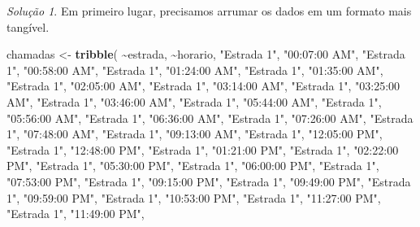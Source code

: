 \documentclass[
]{latex/krantz}
\newenvironment{Shaded}{\begin{snugshade}}{\end{snugshade}}
\newcommand{\FunctionTok}[1]{\textcolor[rgb]{0.13,0.29,0.53}{\textbf{#1}}}
\newcommand{\NormalTok}[1]{#1}
\newcommand{\OtherTok}[1]{\textcolor[rgb]{0.56,0.35,0.01}{#1}}
\newcommand{\SpecialCharTok}[1]{\textcolor[rgb]{0.81,0.36,0.00}{\textbf{#1}}}
\newcommand{\StringTok}[1]{\textcolor[rgb]{0.31,0.60,0.02}{#1}}
\theoremstyle{definition}
\theoremstyle{definition}
\theoremstyle{definition}
\theoremstyle{definition}
\theoremstyle{remark}
\newtheorem*{solution}{Solução}
\begin{document}
\begin{solution}
Em primeiro lugar, precisamos arrumar os dados em um formato mais tangível.

\begin{Shaded}
\begin{Highlighting}[]
\NormalTok{chamadas }\OtherTok{\textless{}{-}} \FunctionTok{tribble}\NormalTok{(}
  \SpecialCharTok{\textasciitilde{}}\NormalTok{estrada, }\SpecialCharTok{\textasciitilde{}}\NormalTok{horario,}
  \StringTok{"Estrada 1"}\NormalTok{, }\StringTok{"00:07:00 AM"}\NormalTok{, }
  \StringTok{"Estrada 1"}\NormalTok{, }\StringTok{"00:58:00 AM"}\NormalTok{, }
  \StringTok{"Estrada 1"}\NormalTok{, }\StringTok{"01:24:00 AM"}\NormalTok{, }
  \StringTok{"Estrada 1"}\NormalTok{, }\StringTok{"01:35:00 AM"}\NormalTok{, }
  \StringTok{"Estrada 1"}\NormalTok{, }\StringTok{"02:05:00 AM"}\NormalTok{, }
  \StringTok{"Estrada 1"}\NormalTok{, }\StringTok{"03:14:00 AM"}\NormalTok{, }
  \StringTok{"Estrada 1"}\NormalTok{, }\StringTok{"03:25:00 AM"}\NormalTok{, }
  \StringTok{"Estrada 1"}\NormalTok{, }\StringTok{"03:46:00 AM"}\NormalTok{,}
  \StringTok{"Estrada 1"}\NormalTok{, }\StringTok{"05:44:00 AM"}\NormalTok{, }
  \StringTok{"Estrada 1"}\NormalTok{, }\StringTok{"05:56:00 AM"}\NormalTok{, }
  \StringTok{"Estrada 1"}\NormalTok{, }\StringTok{"06:36:00 AM"}\NormalTok{,}
  \StringTok{"Estrada 1"}\NormalTok{, }\StringTok{"07:26:00 AM"}\NormalTok{,}
  \StringTok{"Estrada 1"}\NormalTok{, }\StringTok{"07:48:00 AM"}\NormalTok{,}
  \StringTok{"Estrada 1"}\NormalTok{, }\StringTok{"09:13:00 AM"}\NormalTok{,}
  \StringTok{"Estrada 1"}\NormalTok{, }\StringTok{"12:05:00 PM"}\NormalTok{,}
  \StringTok{"Estrada 1"}\NormalTok{, }\StringTok{"12:48:00 PM"}\NormalTok{,}
  \StringTok{"Estrada 1"}\NormalTok{, }\StringTok{"01:21:00 PM"}\NormalTok{,}
  \StringTok{"Estrada 1"}\NormalTok{, }\StringTok{"02:22:00 PM"}\NormalTok{,}
  \StringTok{"Estrada 1"}\NormalTok{, }\StringTok{"05:30:00 PM"}\NormalTok{,}
  \StringTok{"Estrada 1"}\NormalTok{, }\StringTok{"06:00:00 PM"}\NormalTok{, }
  \StringTok{"Estrada 1"}\NormalTok{, }\StringTok{"07:53:00 PM"}\NormalTok{, }
  \StringTok{"Estrada 1"}\NormalTok{, }\StringTok{"09:15:00 PM"}\NormalTok{, }
  \StringTok{"Estrada 1"}\NormalTok{, }\StringTok{"09:49:00 PM"}\NormalTok{, }
  \StringTok{"Estrada 1"}\NormalTok{, }\StringTok{"09:59:00 PM"}\NormalTok{, }
  \StringTok{"Estrada 1"}\NormalTok{, }\StringTok{"10:53:00 PM"}\NormalTok{, }
  \StringTok{"Estrada 1"}\NormalTok{, }\StringTok{"11:27:00 PM"}\NormalTok{, }
  \StringTok{"Estrada 1"}\NormalTok{, }\StringTok{"11:49:00 PM"}\NormalTok{, }

\end{Highlighting}
\end{Shaded}
\end{solution}
\end{document}
